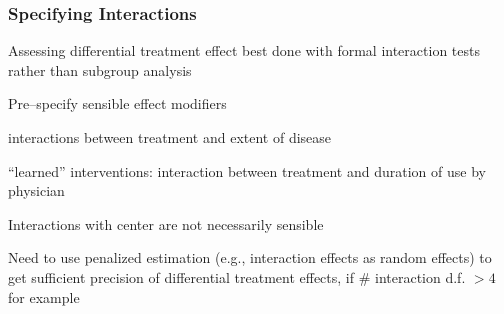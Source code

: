 \subsubsection{Specifying Interactions}
\bi
\item   Assessing differential treatment effect best done with formal
        interaction tests rather than subgroup analysis
\item   Pre--specify sensible effect modifiers
    \bi
    \item   interactions between treatment and extent of disease
    \item   ``learned'' interventions: interaction between treatment
            and duration of use by physician
    \ei
\item   Interactions with center are not necessarily sensible
\item   Need to use penalized estimation (e.g., interaction effects as
        random effects) to get sufficient precision of differential
        treatment effects, if \# interaction d.f. $> 4$ for example
        \cite{sar96hie,yam99inv} \ipacue
\ei
{}

